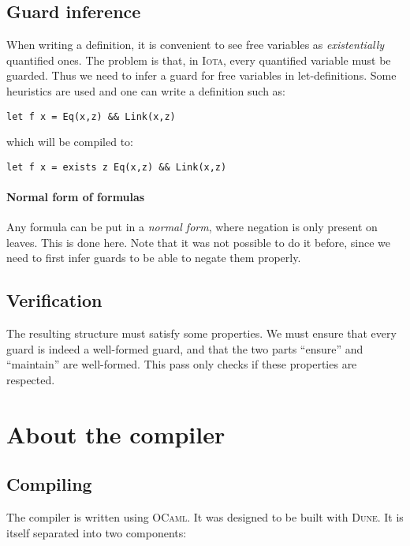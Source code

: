 \documentclass[10pt,a4paper]{article}
\newcommand\Iota{\textsc{Iota}}
\newcommand\Ocaml{\textsc{OCaml}}
\newcommand\Dune{\textsc{Dune}}
\begin{document}
\subsection{Guard inference}
\label{subsec:guardinfer}
When writing a definition, it is convenient to see free variables as \emph{existentially} quantified ones. The problem is that, in \Iota{}, every quantified variable must be guarded. Thus we need to infer a guard for free variables in let-definitions. Some heuristics are used and one can write a definition such as:
\begin{verbatim}
let f x = Eq(x,z) && Link(x,z)
\end{verbatim}
which will be compiled to:
\begin{verbatim}
let f x = exists z Eq(x,z) && Link(x,z)
\end{verbatim}

\paragraph{Normal form of formulas}
Any formula can be put in a \emph{normal form}, where negation is only present on leaves. This is done here. Note that it was not possible to do it before, since we need to first infer guards to be able to negate them properly.

\subsection{Verification}
\label{subsec:verification}
The resulting structure must satisfy some properties. We must ensure that every guard is indeed a well-formed guard, and that the two parts ``ensure'' and ``maintain'' are well-formed. This pass only checks if these properties are respected.

\section{About the compiler}
\subsection{Compiling}
The compiler is written using \Ocaml{}\cite{ocaml}. It was designed to be built with \Dune{}\cite{dune}. It is itself separated into two components:
\end{document}

